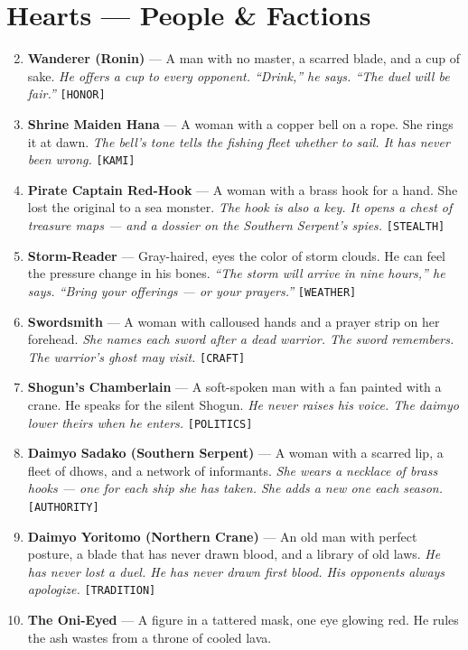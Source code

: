 \section*{Hearts --- People \& Factions}
\label{sec:nihori-people}
\begin{enumerate}
\setcounter{enumi}{1}
\item \textbf{Wanderer (Ronin)} --- A man with no master, a scarred blade, and a cup of sake.
  \hfill \textit{He offers a cup to every opponent. ``Drink,'' he says. ``The duel will be fair.''} \texttt{[HONOR]}
\item \textbf{Shrine Maiden Hana} --- A woman with a copper bell on a rope. She rings it at dawn.
  \hfill \textit{The bell's tone tells the fishing fleet whether to sail. It has never been wrong.} \texttt{[KAMI]}
\item \textbf{Pirate Captain Red-Hook} --- A woman with a brass hook for a hand. She lost the original to a sea monster.
  \hfill \textit{The hook is also a key. It opens a chest of treasure maps --- and a dossier on the Southern Serpent's spies.} \texttt{[STEALTH]}
\item \textbf{Storm-Reader} --- Gray-haired, eyes the color of storm clouds. He can feel the pressure change in his bones.
  \hfill \textit{``The storm will arrive in nine hours,'' he says. ``Bring your offerings --- or your prayers.''} \texttt{[WEATHER]}
\item \textbf{Swordsmith} --- A woman with calloused hands and a prayer strip on her forehead.
  \hfill \textit{She names each sword after a dead warrior. The sword remembers. The warrior's ghost may visit.} \texttt{[CRAFT]}
\item \textbf{Shogun's Chamberlain} --- A soft-spoken man with a fan painted with a crane. He speaks for the silent Shogun.
  \hfill \textit{He never raises his voice. The daimyo lower theirs when he enters.} \texttt{[POLITICS]}
\item \textbf{Daimyo Sadako (Southern Serpent)} --- A woman with a scarred lip, a fleet of dhows, and a network of informants.
  \hfill \textit{She wears a necklace of brass hooks --- one for each ship she has taken. She adds a new one each season.} \texttt{[AUTHORITY]}
\item \textbf{Daimyo Yoritomo (Northern Crane)} --- An old man with perfect posture, a blade that has never drawn blood, and a library of old laws.
  \hfill \textit{He has never lost a duel. He has never drawn first blood. His opponents always apologize.} \texttt{[TRADITION]}
\item \textbf{The Oni-Eyed} --- A figure in a tattered mask, one eye glowing red. He rules the ash wastes from a throne of cooled lava.

\end{enumerate}
